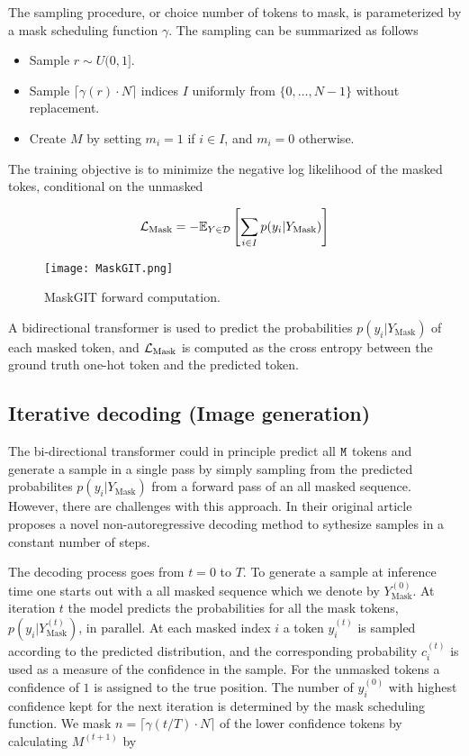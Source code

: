 \documentclass[../../thesis.tex]{subfiles}
\begin{document}
The sampling procedure, or choice number of tokens to mask, is parameterized by a mask scheduling function $\gamma$. The sampling can be summarized as follows

\begin{itemize}
    \item Sample $r \sim U(0,1]$.
    \item Sample $\lceil \gamma(r)\cdot N \rceil$ indices $I$ uniformly from $\{0,\dots,N-1\}$ without replacement. 
    \item Create $M$ by setting $m_i = 1$ if $i\in I$, and $m_i = 0$ otherwise.
\end{itemize}

The training objective is to minimize the negative log likelihood of the masked tokes, conditional on the unmasked

\begin{equation}
    \mathcal{L}_\text{Mask} = -\mathbb{E}_{Y\in \mathcal{D}}\left[\sum_{i \in I} p(y_i|Y_\text{Mask} ) \right]
\end{equation}

\begin{figure}[h]
    \texttt{[image: MaskGIT.png]}
    \centering 
    \label{fig:MaskGIT}
    \caption{MaskGIT forward computation.}
\end{figure}

A bidirectional transformer is used to predict the probabilities $p(y_i|Y_\text{Mask})$ of each masked token, and $\mathcal{L}_\text{Mask}$ is computed as the cross entropy between the ground truth one-hot token and the predicted token.


\subsection{Iterative decoding (Image generation)}

The bi-directional transformer could in principle predict all $\texttt{M}$ tokens and generate a sample in a single pass by simply sampling from the predicted probabilites $p(y_i|Y_\text{Mask})$ from a forward pass of an all masked sequence. However, there are challenges with this approach. In their original article \cite{chang2022maskgit} proposes a novel non-autoregressive decoding method to sythesize samples in a constant number of steps.\newline

The decoding process goes from $t = 0$ to $T$. To generate a sample at inference time one starts out with a all masked sequence which we denote by $Y_\text{Mask}^{(0)}$. At iteration $t$ the model predicts the probabilities for all the mask tokens, $p(y_i|Y_\text{Mask}^{(t)})$, in parallel. At each masked index $i$ a token $y_i^{(t)}$ is sampled according to the predicted distribution, and the corresponding probability $c_i^{(t)}$ is used as a measure of the confidence in the sample. For the unmasked tokens a confidence of $1$ is assigned to the true position. The number of $y_i^{(0)}$ with highest confidence kept for the next iteration is determined by the mask scheduling function. We mask $n = \lceil \gamma(t/T)\cdot N \rceil$ of the lower confidence tokens by calculating $M^{(t+1)}$ by 
\end{document}

